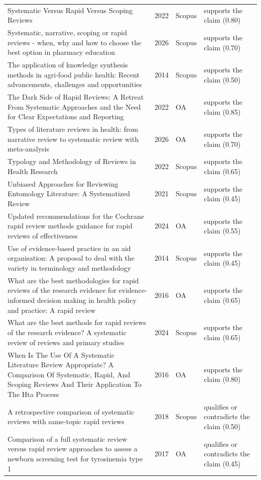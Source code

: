 \begin{longtable}{@{}%
  >{\raggedright\arraybackslash}p{}c%
  >{\raggedright\arraybackslash}p{}%
  >{\raggedright\arraybackslash}p{}@{}}
Systematic Versus Rapid Versus Scoping Reviews & 2022 & Scopus & supports the claim (0.80) \\
Systematic, narrative, scoping or rapid reviews - when, why and how to choose the best option in pharmacy education & 2026 & Scopus & supports the claim (0.70) \\
The application of knowledge synthesis methods in agri-food public health: Recent advancements, challenges and opportunities & 2014 & Scopus & supports the claim (0.50) \\
The Dark Side of Rapid Reviews: A Retreat From Systematic Approaches and the Need for Clear Expectations and Reporting & 2022 & OA & supports the claim (0.85) \\
Types of literature reviews in health: from narrative review to systematic review with meta-analysis & 2026 & OA & supports the claim (0.70) \\
Typology and Methodology of Reviews in Health Research & 2022 & Scopus & supports the claim (0.65) \\
Unbiased Approaches for Reviewing Entomology Literature: A Systematized Review & 2021 & Scopus & supports the claim (0.45) \\
Updated recommendations for the Cochrane rapid review methods guidance for rapid reviews of effectiveness & 2024 & OA & supports the claim (0.55) \\
Use of evidence-based practice in an aid organisation: A proposal to deal with the variety in terminology and methodology & 2014 & Scopus & supports the claim (0.45) \\
What are the best methodologies for rapid reviews of the research evidence for evidence-informed decision making in health policy and practice: A rapid review & 2016 & OA & supports the claim (0.65) \\
What are the best methods for rapid reviews of the research evidence? A systematic review of reviews and primary studies & 2024 & Scopus & supports the claim (0.65) \\
When Is The Use Of A Systematic Literature Review Appropriate? A Comparison Of Systematic, Rapid, And Scoping Reviews And Their Application To The Hta Process & 2016 & OA & supports the claim (0.80) \\
A retrospective comparison of systematic reviews with same-topic rapid reviews & 2018 & Scopus & qualifies or contradicts the claim (0.50) \\
Comparison of a full systematic review versus rapid review approaches to assess a newborn screening test for tyrosinemia type 1 & 2017 & OA & qualifies or contradicts the claim (0.45) \\

\end{longtable}
